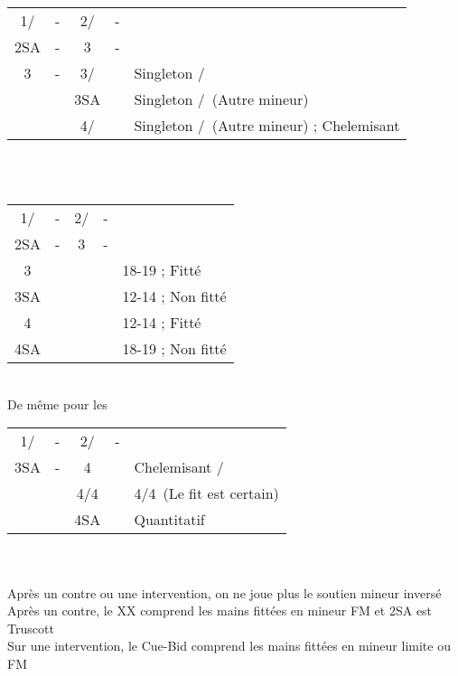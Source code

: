 \documentclass[a4paper, oneside, 11pt]{report}
\begin{document}
		\begin{tabular}{cccc|l}
		1\trefle/\carreau & - & 2\trefle/\carreau & - &\\
		2SA & - & 3\trefle & - &\\
		3\carreau & - & 3\coeur/\pique && Singleton \coeur/\pique\\	
		&& 3SA && Singleton \carreau/\trefle\ (Autre mineur)\\
		&& 4\trefle/\carreau && Singleton \carreau/\trefle\ (Autre mineur) ; Chelemisant\\
		\end{tabular}\\\\

		\begin{tabular}{cccc|l}
		1\trefle/\carreau & - & 2\trefle/\carreau & - &\\
		2SA & - & 3\carreau & - &\\
		3\coeur &&&& 18-19 ; Fitté\\
		3SA &&&& 12-14 ; Non fitté\\
		4\coeur &&&& 12-14 ; Fitté\\
		4SA &&&& 18-19 ; Non fitté\\
		\end{tabular}\\
		De même pour les \pique\\

		\begin{tabular}{cccc|l}
		1\trefle/\carreau & - & 2\trefle/\carreau & - &\\
		3SA & - & 4\trefle && Chelemisant \trefle/\carreau\\
		&& 4\carreau/4\coeur && 4\coeur/4\pique\ (Le fit est certain)\\
		&& 4SA && Quantitatif\\
		\end{tabular}\\\\

		Après un contre ou une intervention, on ne joue plus le soutien mineur inversé\\
		Après un contre, le XX comprend les mains fittées en mineur FM et 2SA est Truscott\\
		Sur une intervention, le Cue-Bid comprend les mains fittées en mineur limite ou FM\\
\end{document}
